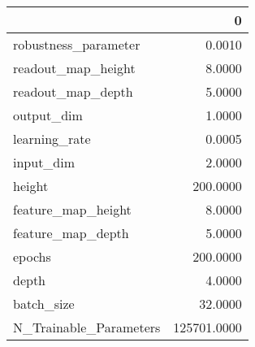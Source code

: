 \begin{tabular}{lr}
\toprule
{} &            0 \\
\midrule
robustness\_parameter   &       0.0010 \\
readout\_map\_height     &       8.0000 \\
readout\_map\_depth      &       5.0000 \\
output\_dim             &       1.0000 \\
learning\_rate          &       0.0005 \\
input\_dim              &       2.0000 \\
height                 &     200.0000 \\
feature\_map\_height     &       8.0000 \\
feature\_map\_depth      &       5.0000 \\
epochs                 &     200.0000 \\
depth                  &       4.0000 \\
batch\_size             &      32.0000 \\
N\_Trainable\_Parameters &  125701.0000 \\
\bottomrule
\end{tabular}
